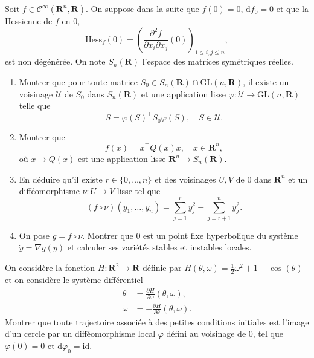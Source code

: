 \documentclass[a4paper,10pt,openany]{article}
\theoremstyle{plain}
\theoremstyle{definition}
\newcommand{\dd}{\mathrm{d}}
\newcommand{\R}{\mathbf{R}}
\newcommand{\id}{\mathrm{id}}
\begin{document}
\vspace{2cm}

 \vspace{1.5mm} 

\noindent Soit $f \in \mathcal{C}^\infty(\R^n, \R)$. On suppose dans la suite que $f(0) = 0$, $\dd f_0 = 0$ et que la Hessienne de $f$ en $0$, 
$$\mathrm{Hess}_f(0) = \left(\frac{\partial^2 f}{\partial x_i \partial x_j} (0) \right)_{1\leq i,j \leq n},$$
est non d\'eg\'en\'er\'ee. On note $S_n(\R)$ l'espace des matrices sym\'etriques r\'eelles.

\begin{enumerate}

\item Montrer que pour toute matrice $S_0 \in S_n(\R) \cap \mathrm{GL}(n,\R)$, il existe un voisinage $\mathcal{U}$ de $S_0$ dans $S_n(\R)$ et une application lisse $\varphi : \mathcal{U} \to \mathrm{GL}(n,\R)$ telle que
$$
S = \varphi(S)^\top S_0\varphi(S), \quad S \in \mathcal{U}.
$$

\item Montrer que $$f(x) = x^\top Q(x) x, \quad x \in \R^n,$$ o\`u $x \mapsto Q(x)$ est une application lisse $\R^n \to S_n(\R)$.

\item En d\'eduire qu'il existe $r \in \{0, \dots, n\}$ et des voisinages $U,V$ de $0$ dans $\R^n$ et un diff\'eomorphisme $\nu : U \to V$ lisse tel que 
$$
(f \circ \nu) (y_1, \dots, y_n) = \sum_{j=1}^r y_j^2 - \sum_{j=r+1}^n y_j^2.
$$

\item On pose $g = f \circ \nu$. Montrer que $0$ est un point fixe hyperbolique du syst\`eme $\dot{y} = \nabla g(y)$ et calculer ses vari\'et\'es stables et instables locales.

\end{enumerate}

\vspace{0.6cm}


 \vspace{1.5mm} 

\noindent On consid\`ere la fonction $H : \R^2 \to \R$ d\'efinie par $\displaystyle{H(\theta, \omega) = \frac{1}{2}\omega^2 + 1 - \cos(\theta)}$ et on consid\`ere le syst\`eme diff\'erentiel
$$
\begin{aligned}
\dot{\theta} &= \frac{\partial H}{\partial \omega}(\theta,\omega), \\
\dot{\omega} &= - \frac{\partial H}{\partial \theta} (\theta,\omega). 
\end{aligned}
$$
Montrer que toute trajectoire associ\'ee \`a des petites conditions initiales est l'image d'un cercle par un diff\'eomorphisme local $\varphi$ d\'efini au voisinage de $0$, tel que $\varphi(0) = 0$ et $\dd \varphi_0 = \id.$
\end{document}
